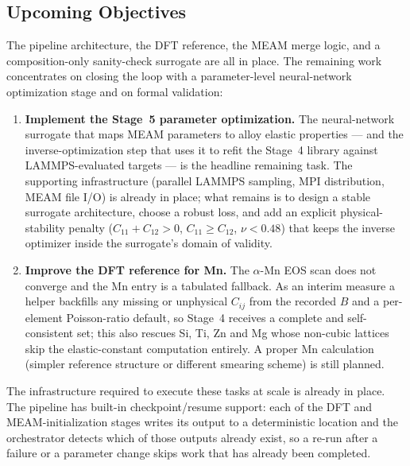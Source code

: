 \futureoutlook
\label{sec:future}

\subsection{Upcoming Objectives}

The pipeline architecture, the DFT reference, the MEAM merge logic, and a
composition-only sanity-check surrogate are all in place. The remaining
work concentrates on closing the loop with a parameter-level
neural-network optimization stage and on formal validation:

\begin{enumerate}
	\item \textbf{Implement the Stage~5 parameter optimization.} The
	      neural-network surrogate that maps MEAM parameters to alloy
	      elastic properties --- and the inverse-optimization step
	      that uses it to refit the Stage~4 library against
	      LAMMPS-evaluated targets --- is the headline remaining
	      task. The supporting infrastructure (parallel LAMMPS
	      sampling, MPI distribution, MEAM file I/O) is already in
	      place; what remains is to design a stable surrogate
	      architecture, choose a robust loss, and add an explicit
	      physical-stability penalty
	      ($C_{11}+C_{12}>0$, $C_{11}\geq C_{12}$, $\nu<0.48$) that
	      keeps the inverse optimizer inside the surrogate's domain
	      of validity.

	\item \textbf{Improve the DFT reference for Mn.} The
	      $\alpha$-Mn EOS scan does not converge and the Mn entry is
	      a tabulated fallback. As an interim measure a helper
	      backfills any missing or unphysical $C_{ij}$ from the
	      recorded $B$ and a per-element Poisson-ratio default, so
	      Stage~4 receives a complete and self-consistent set; this
	      also rescues Si, Ti, Zn and Mg whose non-cubic lattices skip
	      the elastic-constant computation entirely. A proper Mn
	      calculation (simpler reference structure or different
	      smearing scheme) is still planned.
\end{enumerate}

The infrastructure required to execute these tasks at scale is already in
place. The pipeline has built-in checkpoint/resume support: each of the
DFT and MEAM-initialization stages writes its output to a deterministic
location and the orchestrator detects which of those outputs already
exist, so a re-run after a failure or a parameter change skips work
that has already been completed.


